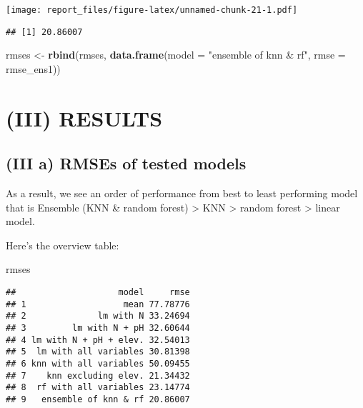 \documentclass[
]{article}
\newenvironment{Shaded}{\begin{snugshade}}{\end{snugshade}}
\newcommand{\DataTypeTok}[1]{\textcolor[rgb]{0.13,0.29,0.53}{#1}}
\newcommand{\KeywordTok}[1]{\textcolor[rgb]{0.13,0.29,0.53}{\textbf{#1}}}
\newcommand{\NormalTok}[1]{#1}
\newcommand{\OperatorTok}[1]{\textcolor[rgb]{0.81,0.36,0.00}{\textbf{#1}}}
\newcommand{\StringTok}[1]{\textcolor[rgb]{0.31,0.60,0.02}{#1}}
\begin{document}
\texttt{[image: report\_files/figure-latex/unnamed-chunk-21-1.pdf]}

\begin{Shaded}
\end{Shaded}

\begin{verbatim}
## [1] 20.86007
\end{verbatim}

\begin{Shaded}
\begin{Highlighting}[]
\NormalTok{rmses <{-}}\StringTok{ }\KeywordTok{rbind}\NormalTok{(rmses, }
               \KeywordTok{data.frame}\NormalTok{(}\DataTypeTok{model =} \StringTok{"ensemble of knn \& rf"}\NormalTok{, }\DataTypeTok{rmse =}\NormalTok{ rmse\_ens1))}
\end{Highlighting}
\end{Shaded}

\newpage

\hypertarget{iii-results}{%
\section{(III) RESULTS}\label{iii-results}}

\hypertarget{iii-a-rmses-of-tested-models}{%
\subsection{(III a) RMSEs of tested
models}\label{iii-a-rmses-of-tested-models}}

As a result, we see an order of performance from best to least
performing model that is Ensemble (KNN \& random forest) \textgreater{}
KNN \textgreater{} random forest \textgreater{} linear model.

Here's the overview table:

\begin{Shaded}
\begin{Highlighting}[]
\NormalTok{rmses}
\end{Highlighting}
\end{Shaded}

\begin{verbatim}
##                    model     rmse
## 1                   mean 77.78776
## 2              lm with N 33.24694
## 3         lm with N + pH 32.60644
## 4 lm with N + pH + elev. 32.54013
## 5  lm with all variables 30.81398
## 6 knn with all variables 50.09455
## 7    knn excluding elev. 21.34432
## 8  rf with all variables 23.14774
## 9   ensemble of knn & rf 20.86007
\end{verbatim}
\end{document}
